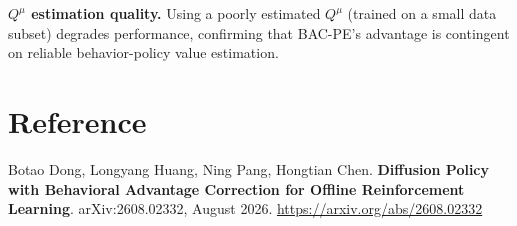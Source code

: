 \documentclass[10pt,twocolumn]{article}
\begin{document}
\textbf{$Q^\mu$ estimation quality.} Using a poorly estimated $Q^\mu$ (trained on
a small data subset) degrades performance, confirming that BAC-PE's advantage
is contingent on reliable behavior-policy value estimation.

\section*{Reference}

Botao Dong, Longyang Huang, Ning Pang, Hongtian Chen.
\textbf{Diffusion Policy with Behavioral Advantage Correction for Offline
Reinforcement Learning}. arXiv:2608.02332, August 2026.
\url{https://arxiv.org/abs/2608.02332}
\end{document}
